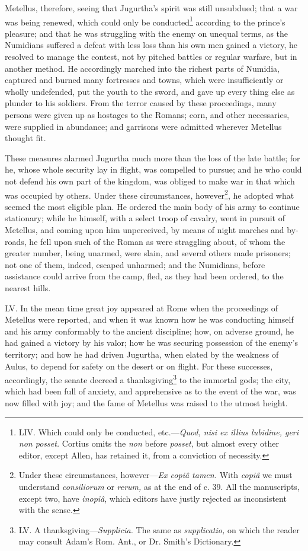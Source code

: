 Metellus, therefore, seeing that Jugurtha's spirit was still
unsubdued; that a war was being renewed, which could only be
conducted\footnote{LIV. Which could only be conducted, etc.—\emph{Quod, nisi ex illius
lubidine, geri non posset.} Cortius omits the \emph{non} before \emph{posset},
but almost every other editor, except Allen, has retained it, from a
conviction of necessity.} according to the prince's pleasure; and that he was
struggling with the enemy on unequal terms, as the Numidians suffered
a defeat with less loss than his own men gained a victory, he resolved
to manage the contest, not by pitched battles or regular warfare, but
in another method. He accordingly marched into the richest parts of
Numidia, captured and burned many fortresses and towns, which were
insufficiently or wholly undefended, put the youth to the sword, and
gave up every thing else as plunder to his soldiers. From the terror
caused by these proceedings, many persons were given up as hostages to
the Romans; corn, and other necessaries, were supplied in abundance;
and garrisons were admitted wherever Metellus thought fit.

These measures alarmed Jugurtha much more than the loss of the late
battle; for he, whose whole security lay in flight, was compelled to
pursue; and he who could not defend his own part of the kingdom, was
obliged to make war in that which was occupied by others. Under these
circumstances, however\footnote{Under these circumstances, however—\emph{Ex copiâ tamen.} With
\emph{copiâ} we must understand \emph{consiliorum} or \emph{rerum,} as at the end of
c. 39. All the manuscripts, except two, have \emph{inopiâ}, which editors
have justly rejected as inconsistent with the sense.}, he adopted what seemed the most eligible
plan. He ordered the main body of his army to continue stationary;
while he himself, with a select troop of cavalry, went in pursuit of
Metellus, and coming upon him unperceived, by means of night marches
and by-roads, he fell upon such of the Roman as were straggling about,
of whom the greater number, being unarmed, were slain, and several
others made prisoners; not one of them, indeed, escaped unharmed; and
the Numidians, before assistance could arrive from the camp, fled, as
they had been ordered, to the nearest hills.

LV. In the mean time great joy appeared at Rome when the proceedings
of Metellus were reported, and when it was known how he was conducting
himself and his army conformably to the ancient discipline; how, on
adverse ground, he had gained a victory by his valor; how he was
securing possession of the enemy's territory; and how he had driven
Jugurtha, when elated by the weakness of Aulus, to depend for safety
on the desert or on flight. For these successes, accordingly, the
senate decreed a thanksgiving\footnote{LV. A thanksgiving—\emph{Supplicia.} The same as \emph{supplicatio,} on
which the reader may consult Adam's Rom. Ant., or Dr. Smith's
Dictionary.} to the immortal gods; the city,
which had been full of anxiety, and apprehensive as to the event of
the war, was now filled with joy; and the fame of Metellus was raised
to the utmost height.

